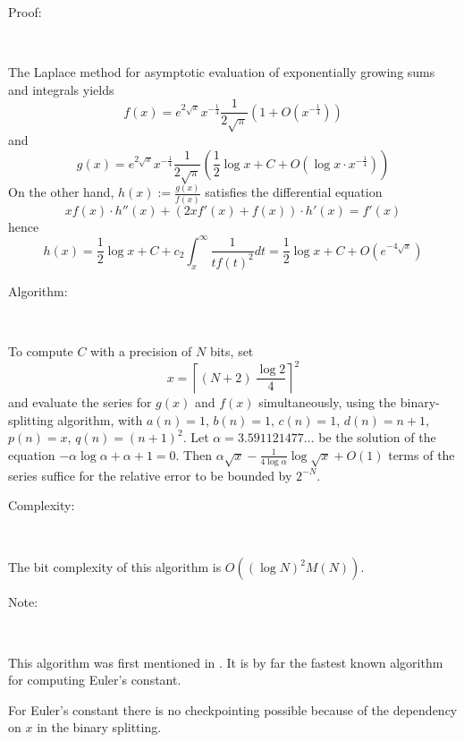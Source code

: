 \begin{description}
\item [Proof:]~
\end{description}

The Laplace method for asymptotic evaluation of exponentially growing
sums and integrals yields 
\[
f(x)=
e^{2\sqrt{x}}x^{-\frac{1}{4}}\frac{1}{2\sqrt{\pi }}(1+O(x^{-\frac{1}{4}}))\]
 and 
\[
g(x)=e^{2\sqrt{x}}x^{-\frac{1}{4}}\frac{1}{2\sqrt{\pi }}
\left(\frac{1}{2}\log x+C+O(\log x\cdot x^{-\frac{1}{4}})\right)\]
On the other hand,  \( h(x):=\frac{g(x)}{f(x)} \) satisfies the
differential equation 
\[
xf(x)\cdot h''(x)+(2xf'(x)+f(x))\cdot h'(x)=f'(x)\]
hence 
\[
h(x)=\frac{1}{2}\log x+C+c_{2}
\int ^{\infty }_{x}\frac{1}{tf(t)^{2}}dt=\frac{1}{2}\log x+C+O(e^{-4\sqrt{x}})\]


\begin{description}
\item [Algorithm:]~
\end{description}

To compute  \( C \) with a precision of  \( N \) bits, set  
\[ x=\left\lceil (N+2)\: \frac{\log 2}{4}\right\rceil ^{2} \]
and evaluate the series for  \( g(x) \) and  \( f(x) \) simultaneously,
using the binary-splitting algorithm,
with  \( a(n)=1 \),  \( b(n)=1 \),  \( c(n)=1 \),  \( d(n)=n+1 \),  
\( p(n)=x \),  \( q(n)=(n+1)^{2} \). Let  \( \alpha =3.591121477\ldots  \) 
be the solution of the equation  \( -\alpha \log \alpha +\alpha +1=0 \). Then
 \( \alpha \sqrt{x}-\frac{1}{4\log \alpha }\log \sqrt{x}+O(1) \) 
terms of the series suffice for the relative error to be bounded
by  \( 2^{-N} \).

\begin{description}
\item [Complexity:]~
\end{description}

The bit complexity of this algorithm is  \( O((\log N)^{2}M(N)) \).

\begin{description}
\item [Note:]~
\end{description}

This algorithm was first mentioned in \cite{80}. It is by far
the fastest known algorithm for computing Euler's constant. 

For Euler's constant there is no checkpointing possible because 
of the dependency on \( x \) in the binary splitting.


